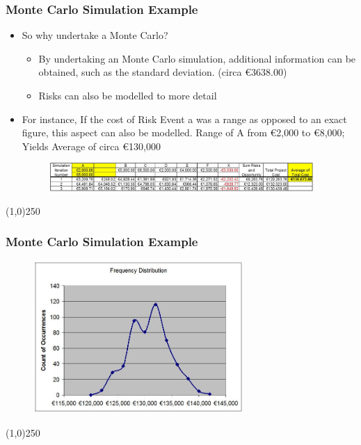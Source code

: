 \begin{frame}
\frametitle{Monte Carlo Simulation Example}
\begin{itemize}
\item So why undertake a Monte Carlo?
\begin{itemize}
	\item By undertaking an Monte Carlo simulation, additional information can be obtained, such as the standard deviation. (circa \euro3638.00)
\item Risks can also be modelled to more detail
\end{itemize}
\item For instance, If the cost of Risk Event a was a range as opposed to an exact figure, this aspect can also be modelled.
Range of A from \euro2,000 to \euro8,000; Yields Average of circa \euro130,000\begin{figure}
	\centering
		\includegraphics[width = 10cm]{images/montelimit.jpg}
	\label{fig:mc2}
\end{figure}
\end{itemize}
\end{frame}\begin{center}\line(1,0){250}\end{center}



\begin{frame}
\frametitle{Monte Carlo Simulation Example}
\begin{figure}[h]
	\centering
		\includegraphics[width = 8cm]{images/montisample.jpg}
	\label{fig:montisample}
\end{figure}

\end{frame}\begin{center}\line(1,0){250}\end{center}







